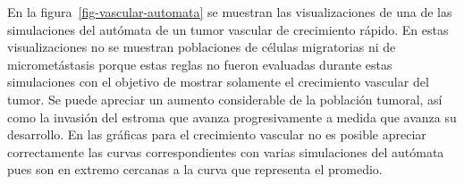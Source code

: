 En la figura~\ref{fig-vascular-automata} se muestran las visualizaciones de una de las simulaciones del aut\'omata de un tumor vascular de crecimiento r\'apido. En estas visualizaciones no se muestran poblaciones de c\'elulas migratorias ni de micromet\'astasis porque estas reglas no fueron evaluadas durante estas simulaciones con el objetivo de mostrar solamente el crecimiento vascular del tumor. Se puede apreciar un aumento considerable de la poblaci\'on tumoral, as\'i como la invasi\'on del estroma que avanza progresivamente a medida que avanza su desarrollo. En las gr\'aficas para el crecimiento vascular no es posible apreciar correctamente las curvas correspondientes con varias simulaciones del aut\'omata pues son en extremo cercanas a la curva que representa el promedio.
\begin{figure}[!ht]
\begin{center}

\end{center}
\end{figure}
